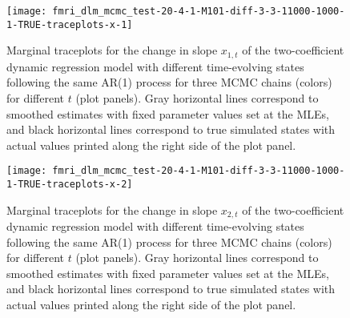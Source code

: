 \documentclass{article}
\begin{document}
\begin{figure}[ht]
\texttt{[image: fmri\_dlm\_mcmc\_test-20-4-1-M101-diff-3-3-11000-1000-1-TRUE-traceplots-x-1]}
\caption{Marginal traceplots for the change in slope $x_{1,t}$ of the two-coefficient dynamic regression model with different time-evolving states following the same AR(1) process for three MCMC chains (colors) for different $t$ (plot panels). Gray horizontal lines correspond to smoothed estimates with fixed parameter values set at the MLEs, and black horizontal lines correspond to true simulated states with actual values printed along the right side of the plot panel.} \label{fig:tracex-drdiffsame1}
\end{figure}

\begin{figure}[ht]
\texttt{[image: fmri\_dlm\_mcmc\_test-20-4-1-M101-diff-3-3-11000-1000-1-TRUE-traceplots-x-2]}
\caption{Marginal traceplots for the change in slope $x_{2,t}$ of the two-coefficient dynamic regression model with different time-evolving states following the same AR(1) process for three MCMC chains (colors) for different $t$ (plot panels). Gray horizontal lines correspond to smoothed estimates with fixed parameter values set at the MLEs, and black horizontal lines correspond to true simulated states with actual values printed along the right side of the plot panel.} \label{fig:tracex-drdiffsame2}
\end{figure}

\clearpage



\end{document}
